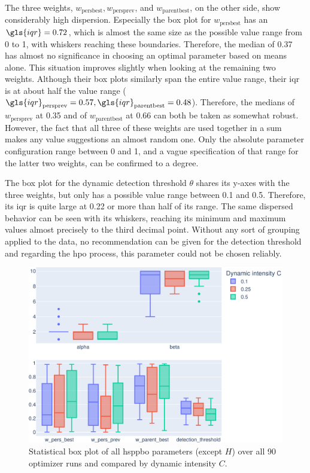 The three weights,  $w_{\text{persbest}}, w_{\text{persprev}}$, and $w_{\text{parentbest}}$, on the other side, show considerably high dispersion. Especially the box plot for $w_{\text{persbest}}$ has an $\gls{iqr} = 0.72$, which is almost the same size as the possible value range from 0 to 1, with whiskers reaching these boundaries. Therefore, the median of 0.37 has almost no significance in choosing an optimal parameter based on means alone. This situation improves slightly when looking at the remaining two weights. Although their box plots similarly span the entire value range, their \gls{iqr} is at about half the value range ($\gls{iqr}_\text{persprev} = 0.57, \gls{iqr}_\text{parentbest} = 0.48$). Therefore, the medians of $w_{\text{persprev}}$ at 0.35 and of $w_{\text{parentbest}}$ at 0.66 can both be taken as somewhat robust. However, the fact that all three of these weights are used together in a sum makes any value suggestions an almost random one. Only the absolute parameter configuration range between 0 and 1, and a vague specification of that range for the latter two weights, can be confirmed to a degree.

The box plot for the dynamic detection threshold $\theta$ shares its y-axes with the three weights, but only has a possible value range between 0.1 and 0.5. Therefore, its \gls{iqr} is quite large at 0.22 or more than half of its range. The same dispersed behavior can be seen with its whiskers, reaching its minimum and maximum values almost precisely to the third decimal point. Without any sort of grouping applied to the data, no recommendation can be given for the detection threshold and regarding the \gls{hpo} process, this parameter could not be chosen reliably.

\begin{figure}[h]
	\centering
	\includegraphics[width=\textwidth]{results/part2/parameter_boxplot_dynamic.svg}
	\caption[Statistical box plot of \gls{hsppbo} parameters compared by dynamic intensity]{Statistical box plot of all \gls{hsppbo} parameters (except $H$) over all 90 optimizer runs and compared by dynamic intensity $C$.}
	\label{fig:parameter_boxplot_dynamic}
\end{figure}

